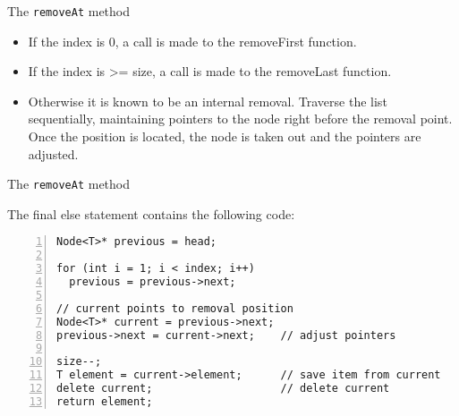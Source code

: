 \documentclass{beamer}
\begin{document}

\begin{frame}[fragile]{The \lstinline$removeAt$ method}

\begin{itemize}
\item If the index is 0, a call is made to the
removeFirst function.
\item If the index is >= size, a call is made to the
removeLast function.
\item Otherwise it is known to be an internal removal. Traverse the
  list sequentially, maintaining pointers to the node right before the
  removal point. Once the position is located, the node is taken out
  and the pointers are adjusted.
\end{itemize}

\end{frame}


\begin{frame}[fragile]{The \lstinline$removeAt$ method}

The final else statement contains the following code:

\begin{lstlisting}[numbers=left]
Node<T>* previous = head; 

for (int i = 1; i < index; i++)
  previous = previous->next;

// current points to removal position
Node<T>* current = previous->next; 
previous->next = current->next;    // adjust pointers

size--;
T element = current->element;      // save item from current
delete current;	                   // delete current
return element;
\end{lstlisting}

\end{frame}

\end{document}
